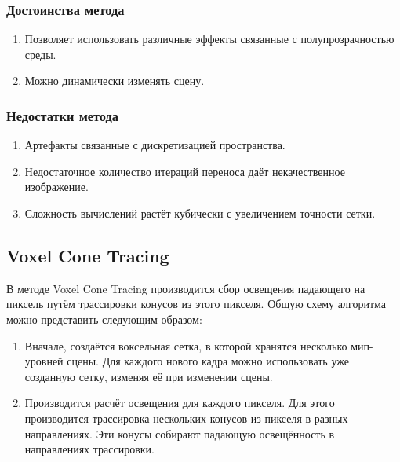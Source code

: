 \documentclass[12pt,fleqn]{article}
\begin{document}
\subsubsection{Достоинства метода}

\begin{enumerate}

\item Позволяет использовать различные эффекты связанные с полупрозрачностью среды.

\item Можно динамически изменять сцену.

\end{enumerate}

\subsubsection{Недостатки метода}

\begin{enumerate}

\item Артефакты связанные с дискретизацией пространства.

\item Недостаточное количество итераций переноса даёт некачественное изображение.

\item Сложность вычислений растёт кубически с увеличением точности сетки.

\end{enumerate}

\subsection{Voxel Cone Tracing}

В методе Voxel Cone Tracing производится сбор освещения падающего на пиксель путём трассировки конусов из этого пикселя. Общую схему алгоритма можно представить следующим образом:

\begin{enumerate}

\item Вначале, создаётся воксельная сетка, в которой хранятся несколько мип-уровней сцены. Для каждого нового кадра можно использовать уже созданную сетку, изменяя её при изменении сцены.

\item Производится расчёт освещения для каждого пикселя. Для этого производится трассировка нескольких конусов из пикселя в разных направлениях. Эти конусы собирают падающую освещённость в направлениях трассировки.

\end{enumerate}
\end{document}
